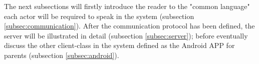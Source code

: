 \medskip
The next subsections will firstly introduce the reader to the "common language" each actor will be required to speak in the system (subsection \ref{subsec:communication}). After the communication protocol has been defined, the server will be illustrated in detail (subsection \ref{subsec:server}); before eventually discuss the other client-class in the system defined as the Android APP for parents (subsection \ref{subsec:android}).